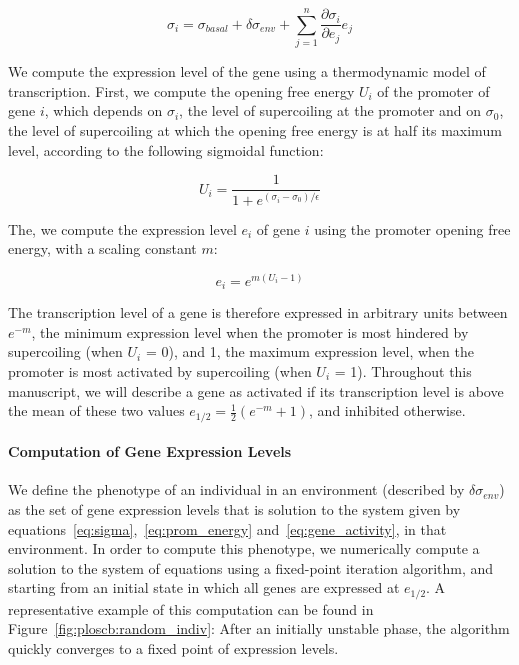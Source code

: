 \begin{equation}
  \sigma_i = \sigma_{basal} + \delta\sigma_{env} + \sum_{j=1}^n\frac{\partial\sigma_{i}}{\partial e_j}e_j
  \label{eq:sigma}
\end{equation}

We compute the expression level of the gene using a thermodynamic model of transcription.
First, we compute the opening free energy $U_i$ of the promoter of gene $i$, which depends on $\sigma_i$, the level of supercoiling at the promoter and on $\sigma_0$, the level of supercoiling at which the opening free energy is at half its maximum level, according to the following sigmoidal function:

\begin{equation}
  U_i = \frac{1}{1 + e^{(\sigma_i - \sigma_0)/\epsilon}}
  \label{eq:prom_energy}
\end{equation}

The, we compute the expression level $e_i$ of gene $i$ using the promoter opening free energy, with a scaling constant $m$:

\begin{equation}
  e_i = e^{m (U_i - 1)}
  \label{eq:gene_activity}
\end{equation}

The transcription level of a gene is therefore expressed in arbitrary units between $e^{-m}$, the minimum expression level when the promoter is most hindered by supercoiling (when $U_i$ = 0), and 1, the maximum expression level, when the promoter is most activated by supercoiling (when $U_i$ = 1).
Throughout this manuscript, we will describe a gene as activated if its transcription level is above the mean of these two values $e_{1/2} = \frac{1}{2}(e^{-m} + 1)$, and inhibited otherwise.

\paragraph{Computation of Gene Expression Levels}

We define the phenotype of an individual in an environment (described by $\delta\sigma_{env}$) as the set of gene expression levels that is solution to the system given by equations~\ref{eq:sigma},~\ref{eq:prom_energy} and~\ref{eq:gene_activity}, in that environment.
In order to compute this phenotype, we numerically compute a solution to the system of equations using a fixed-point iteration algorithm, and starting from an initial state in which all genes are expressed at $e_{1/2}$.
A representative example of this computation can be found in Figure~\ref{fig:ploscb:random_indiv}: After an initially unstable phase, the algorithm quickly converges to a fixed point of expression levels.

